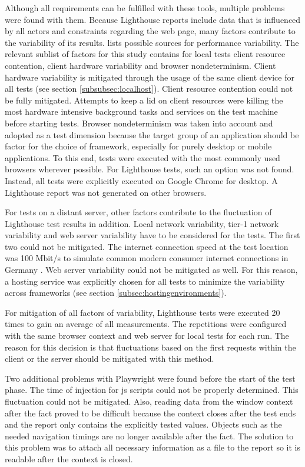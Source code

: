 \documentclass[a4paper, 12pt]{article}
\begin{document}
Although all requirements can be fulfilled with these tools, multiple problems were found with them.
Because Lighthouse reports include data that is influenced by all actors and constraints regarding the web page, many factors contribute to the variability of its results.
\cite{lighthouseVariability} lists possible sources for performance variability.
The relevant sublist of factors for this study contains for local tests client resource contention, client hardware variability and browser nondeterminism.
Client hardware variability is mitigated through the usage of the same client device for all tests (see section \ref{subsubsec:localhost}).
Client resource contention could not be fully mitigated.
Attempts to keep a lid on client resources were killing the most hardware intensive background tasks and services on the test machine before starting tests.
Browser nondeterminism was taken into account and adopted as a test dimension because the target group of an application should be factor for the choice of framework, especially for purely desktop or mobile applications.
To this end, tests were executed with the most commonly used browsers wherever possible.
For Lighthouse tests, such an option was not found.
Instead, all tests were explicitly executed on Google Chrome for desktop.
A Lighthouse report was not generated on other browsers.

For tests on a distant server, other factors contribute to the fluctuation of Lighthouse test results in addition.
Local network variability, tier-1 network variability and web server variability have to be considered for the tests.
The first two could not be mitigated.
The internet connection speed at the test location was 100 Mbit/s to simulate common modern consumer internet connections in Germany \citep{internetconnections}.
Web server variability could not be mitigated as well.
For this reason, a hosting service was explicitly chosen for all tests to minimize the variability across frameworks (see section \ref{subsec:hostingenvironments}).

For mitigation of all factors of variability, Lighthouse tests were executed 20 times to gain an average of all measurements.
The repetitions were configured with the same browser context and web server for local tests for each run.
The reason for this decision is that fluctuations based on the first requests within the client or the server should be mitigated with this method.

Two additional problems with Playwright were found before the start of the test phase.
The time of injection for \acrshort{js} scripts could not be properly determined.
This fluctuation could not be mitigated.
Also, reading data from the window context after the fact proved to be difficult because the context closes after the test ends and the report only contains the explicitly tested values.
Objects such as the needed navigation timings are no longer available after the fact.
The solution to this problem was to attach all necessary information as a file to the report so it is readable after the context is closed.
\end{document}
